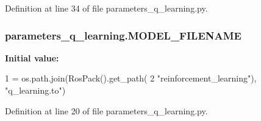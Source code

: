 Definition at line 34 of file parameters\+\_\+q\+\_\+learning.\+py.

\subsubsection[{\texorpdfstring{M\+O\+D\+E\+L\+\_\+\+F\+I\+L\+E\+N\+A\+ME}{MODEL_FILENAME}}]{\setlength{\rightskip}{0pt plus 5cm}parameters\+\_\+q\+\_\+learning.\+M\+O\+D\+E\+L\+\_\+\+F\+I\+L\+E\+N\+A\+ME}\hypertarget{namespaceparameters__q__learning_ae9a9619d0b3871b2198c290d3c1d413c}{}\label{namespaceparameters__q__learning_ae9a9619d0b3871b2198c290d3c1d413c}
{\bfseries Initial value\+:}
\begin{DoxyCode}
1 = os.path.join(RosPack().get\_path(
2     \textcolor{stringliteral}{"reinforcement\_learning"}), \textcolor{stringliteral}{"q\_learning.to"})
\end{DoxyCode}


Definition at line 20 of file parameters\+\_\+q\+\_\+learning.\+py.

